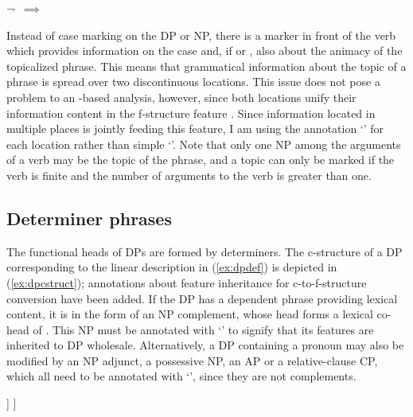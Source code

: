 \ex\label{ex:topicrule}
¬\,\downs{\Case} $\implies$ \elem{\Top}
\xe

Instead of case marking on the DP or NP, there is a marker in front of the verb 
which provides information on the case and, if \AgtT{} or \PatT{}, also about 
the animacy of the topicalized phrase. This means that grammatical information 
about the topic of a phrase is spread over two discontinuous locations. This 
issue does not pose a problem to an \Lfg{}-based analysis, however, since both 
locations unify their information content in the f-structure feature \Top{}. 
Since information located in multiple places is jointly feeding this feature, I 
am using the annotation `\elem{\Top}' for each location rather than simple 
`\pass{\Top}'. Note that only one NP among the arguments of a verb may be the 
topic of the phrase, and a topic can only be marked if the verb is finite and 
the number of arguments to the verb is greater than one.

\subsection{Determiner phrases}
\label{subsec:dps}

The functional heads of DPs are formed by determiners. The c-structure of a DP 
corresponding to the linear description in (\ref{ex:dpdef}) is depicted in 
(\ref{ex:dpcstruct}); annotations about feature inheritance for 
c-to-f-structure conversion have been added. If the DP has a dependent phrase 
providing lexical content, it is in the form of an NP complement, whose head 
forms a lexical co-head of . This NP must be annotated with `\updown{}' 
to signify that its features are inherited to DP wholesale. Alternatively, a DP 
containing a pronoun may also be modified by an NP adjunct, a possessive NP, an 
AP or a relative-clause CP, which all need to be annotated with `\pass{\Adj}', 
since they are not complements.

\ex\label{ex:dpcstruct}
\begin{forest}
[{\anno[\pass{df} \logor{} \pass{gf}]{DP}}
	[\anno{\xbar{D}}
		[\anno{\xhead{D}}]
		[{$\left(\anno[{%
		\updown{}\\%
		\logor{} \pass{\Adj}%
	}]{XP}\right)$}]
	]
]
\end{forest}
\xe

